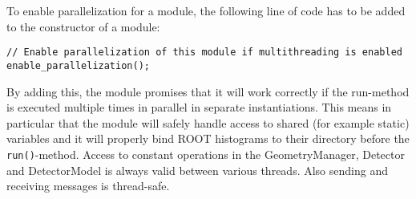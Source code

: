To enable parallelization for a module, the following line of code has to be added to the constructor of a module:
\begin{verbatim}
// Enable parallelization of this module if multithreading is enabled
enable_parallelization();
\end{verbatim}
By adding this, the module promises that it will work correctly if the run-method is executed multiple times in parallel in separate instantiations.
This means in particular that the module will safely handle access to shared (for example static) variables and it will properly bind ROOT histograms to their directory before the \texttt{run()}-method.
Access to constant operations in the GeometryManager, Detector and DetectorModel is always valid between various threads. Also sending and receiving messages is thread-safe.

